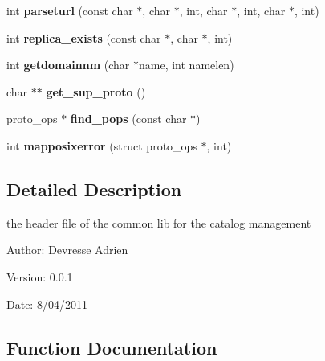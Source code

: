 \begin{CompactItemize}
\item 
int \textbf{parseturl} (const char $\ast$, char $\ast$, int, char $\ast$, int, char $\ast$, int)\label{gfal__common__catalog_8h_70868bce152313f31e24982453f10723}

\item 
int \textbf{replica\_\-exists} (const char $\ast$, char $\ast$, int)\label{gfal__common__catalog_8h_ac34379d44fb4037af134b34a9aae030}

\item 
int \textbf{getdomainnm} (char $\ast$name, int namelen)\label{gfal__common__catalog_8h_446a829e4f333d3a0364ab0f2b5a2dc7}

\item 
char $\ast$$\ast$ \textbf{get\_\-sup\_\-proto} ()\label{gfal__common__catalog_8h_03347619db3b30ef54ae6a98e351e21f}

\item 
proto\_\-ops $\ast$ \textbf{find\_\-pops} (const char $\ast$)\label{gfal__common__catalog_8h_40d4c392e45e16062bc90caf0ebfa436}

\item 
int \textbf{mapposixerror} (struct proto\_\-ops $\ast$, int)\label{gfal__common__catalog_8h_c8360922877ec368815d412209e862a2}

\end{CompactItemize}


\subsection{Detailed Description}
the header file of the common lib for the catalog management 

\begin{Desc}
\item[Author:]Devresse Adrien \end{Desc}
\begin{Desc}
\item[Version:]0.0.1 \end{Desc}
\begin{Desc}
\item[Date:]8/04/2011 \end{Desc}


\subsection{Function Documentation}
